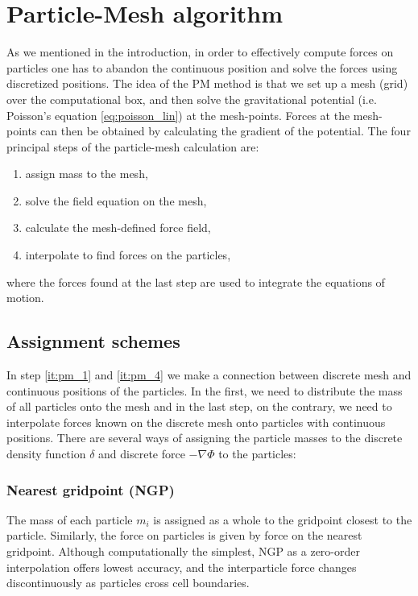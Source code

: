 \section{Particle-Mesh algorithm}
\label{sec:PM}
As we mentioned in the introduction, in order to effectively compute forces on particles one has to abandon the continuous position and solve the forces using discretized positions. The idea of the PM method is that we set up a mesh (grid) over the computational box, and then solve the gravitational potential (i.e. Poisson’s equation \eqref{eq:poisson_lin}) at the mesh-points. Forces at the mesh-points can then be obtained by calculating the gradient of the potential. The four principal steps of the particle-mesh calculation are:
\begin{enumerate}
    \item assign mass to the mesh,
    \label{it:pm_1}
    \item solve the field equation on the mesh,
    \label{it:pm_2}
    \item calculate the mesh-defined force field,
    \label{it:pm_3}
    \item interpolate to find forces on the particles,
    \label{it:pm_4}
\end{enumerate}
where the forces found at the last step are used to integrate the equations of motion.
\subsection{Assignment schemes}
In step \ref{it:pm_1} and \ref{it:pm_4} we make a connection between discrete mesh and continuous positions of the particles. In the first, we need to distribute the mass of all particles onto the mesh and in the last step, on the contrary, we need to interpolate forces known on the discrete mesh onto particles with continuous positions. There are several ways of assigning the particle masses to the discrete density function $\delta$ and discrete force $-\nabla\Phi$ to the particles:

\subsubsection{Nearest gridpoint (NGP)}
The mass of each particle $m_i$ is assigned as a whole to the gridpoint closest to the particle. Similarly, the force on particles is given by force on the nearest gridpoint. Although computationally the simplest, NGP as a zero-order interpolation offers lowest accuracy, and the interparticle force changes discontinuously as particles cross cell boundaries.


